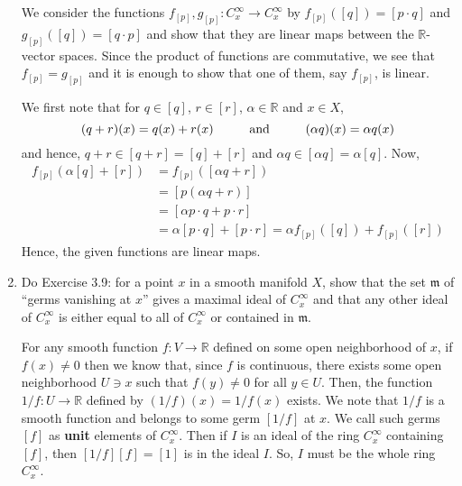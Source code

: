 \documentclass[12pt]{article}
\newcommand{\germs}{C_x^\infty}
\newcommand{\rl}{\mathbb{R}}
\begin{document}
\begin{enumerate}
\begin{mybox}

    We consider the functions $f_{[p]}, g_{[p]}:
    \germs\to\germs$ by $f_{[p]}([q])=[p\cdot q]$ and
    $g_{[p]}([q])=[q\cdot p]$ and show that they are
    linear maps between the $\rl$-vector spaces.
    Since the product of functions are commutative, we
    see that $f_{[p]}=g_{[p]}$ and it is enough to show
    that one of them, say $f_{[p]}$, is linear.

    \vspace*{3mm}
    We first note that for $q\in[q]$, $r\in[r]$,
    $\alpha\in\rl$ and $x\in X$,
    $$(q+r)(x)=q(x)+r(x)\hspace*{10mm}\text{and}
    \hspace*{10mm}(\alpha q)(x)=\alpha q(x)$$
    and hence, $q+r\in [q+r]=[q]+[r]$ and
    $\alpha q\in [\alpha q]=\alpha[q]$.
    Now,
    \begin{equation*}
        \begin{split}
            f_{[p]}(\alpha[q]+[r])&=f_{[p]}([\alpha q+r])\\
            &=[p(\alpha q +r)]\\
            &=[\alpha p\cdot q+p\cdot r]\\
            &=\alpha[p\cdot q]+[p\cdot r]=
            \alpha f_{[p]}([q])+f_{[p]}([r])
        \end{split}
    \end{equation*}
    Hence, the given functions are linear maps.
\end{mybox}

\item Do Exercise 3.9: for a point $x$ in a smooth
    manifold $X$, show that the set $\mathfrak{m}$ of
    ``germs vanishing at $x$'' gives a maximal ideal of
    $C^{\infty}_x$ and that any other ideal of
    $C^{\infty}_x$ is either equal to all of $C^{\infty}_x$
    or contained in $\mathfrak{m}$.

\begin{mybox}
    
    For any smooth function $f:V\to \rl$ defined on some
    open neighborhood of $x$, if $f(x)\neq 0$ then we
    know that, since $f$ is continuous, there exists some
    open neighborhood $U\ni x$ such that $f(y)\neq 0$ for
    all $y\in U$. Then, the function $1/f:U\to\rl$ defined
    by $(1/f)(x)=1/f(x)$ exists. We note that $1/f$
    is a smooth function and belongs to some germ $[1/f]$
    at $x$. We call such germs $[f]$ as \textbf{unit}
    elements of $C_x^\infty$.
    Then if $I$ is an ideal of the ring $C_x^\infty$
    containing $[f]$, then $[1/f][f]=[1]$ is in the ideal
    $I$. So, $I$ must be the whole ring $C_x^\infty$.


\end{mybox}
\end{enumerate}
\end{document}
